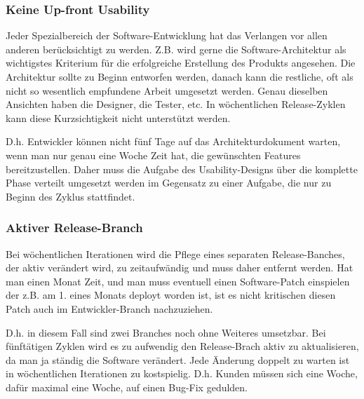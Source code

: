 \subsubsection{Keine Up-front Usability}
Jeder Spezialbereich der Software-Entwicklung hat das Verlangen vor allen
anderen berücksichtigt zu werden. Z.B. wird gerne die Software-Architektur als
wichtigstes Kriterium für die erfolgreiche Erstellung des Produkts angesehen.
Die Architektur sollte zu Beginn entworfen werden, danach kann die restliche,
oft als nicht so wesentlich empfundene Arbeit umgesetzt werden. Genau
dieselben Ansichten haben die Designer, die Tester, etc. In wöchentlichen
Release-Zyklen kann diese Kurzsichtigkeit nicht unterstützt werden.

D.h. Entwickler können nicht fünf Tage auf das Architekturdokument warten,
wenn man nur genau eine Woche Zeit hat, die gewünschten Features
bereitzustellen. Daher muss die Aufgabe des Usability-Designs über die
komplette Phase verteilt umgesetzt werden im Gegensatz zu einer Aufgabe, die
nur zu Beginn des Zyklus stattfindet.

\subsubsection{Aktiver Release-Branch}
Bei wöchentlichen Iterationen wird die Pflege eines separaten Release-Banches,
der aktiv verändert wird, zu zeitaufwändig und muss daher entfernt werden. Hat
man einen Monat Zeit, und man muss eventuell einen Software-Patch einspielen
der z.B. am 1. eines Monats deployt worden ist, ist es nicht kritischen diesen
Patch auch im Entwickler-Branch nachzuziehen.

D.h. in diesem Fall sind zwei Branches noch ohne Weiteres umsetzbar. Bei
fünftätigen Zyklen wird es zu aufwendig den Release-Brach aktiv zu
aktualisieren, da man ja ständig die Software verändert. Jede Änderung doppelt
zu warten ist in wöchentlichen Iterationen zu kostspielig. D.h. Kunden müssen
sich eine Woche, dafür maximal eine Woche, auf einen Bug-Fix gedulden.
